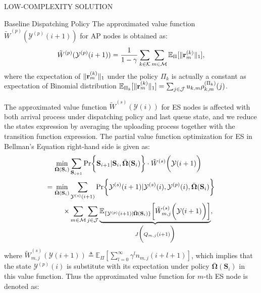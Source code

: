 \documentclass[10pt, conference, letterpaper]{IEEEtran}
\newcommand{\define}{\triangleq}
\renewcommand{\vec}{\mathbf}
\DeclarePairedDelimiter{\set}{\{}{\}}
\DeclarePairedDelimiter{\Inorm}{\|}{\|_1}
\DeclarePairedDelimiter{\Paren}{\bigg(}{\bigg)}
\DeclarePairedDelimiter{\Bracket}{\bigg[}{\bigg]}
\DeclarePairedDelimiter{\Brace}{\bigg\{}{\bigg\}}
\newcommand{\apSet}{\mathcal{K}}
\newcommand{\esSet}{\mathcal{M}}
\newcommand{\jSpace}{\mathcal{J}}
\newcommand{\Stat}{\mathbf{S}}
\newcommand{\Obsv}{\mathcal{Y}}
\newcommand{\Policy}{\boldsymbol{\Omega}}
\newcommand{\BPolicy}{\bar{\Policy}}
\begin{document}
\begin{section}{LOW-COMPLEXITY SOLUTION}
\begin{subsection}{Baseline Dispatching Policy}
            The approximated value function $\tilde{W}^{(p)}(\Obsv^{(p)}(i+1))$ for AP nodes is obtained as:
            \begin{align}
                \tilde{W}^{(p)}(\Obsv^{(p)}(i+1)) = \frac{1}{1-\gamma}
                    \sum_{k\in\apSet}\sum_{m\in\esSet} \mathbb{E}_{\Pi}[\Inorm{\vec{r}^{(k)}_{m}}],
            \end{align}
            where the expectation of $\Inorm{\vec{r}^{(k)}_{m}}$ under the policy $\Pi_k$ is actually a constant as expectation of Binomial distribution $\mathbb{E}_{\Pi_k}[\Inorm{\vec{r}^{(k)}_{m}}] = \sum_{j\in\jSpace} u_{k,m} \rho^{(\Pi_k)}_{k,m}(j)$.
            
            The approximated value function $\tilde{W}^{(s)}(\Obsv(i))$ for ES nodes is affected with both arrival process under dispatching policy and last queue state, and we reduce the states expression by averaging the uploading process together with the transition function expression.
            The partial value function optimization for ES in Bellman's Equation right-hand side is given as:
            \begin{align}
                \min_{\BPolicy(\Stat_i)}& \sum_{\Stat_{i+1}}
                    \Pr\Brace{\Stat_{i+1}|\Stat_{i}, \BPolicy(\Stat_i)} \cdot \tilde{W}^{(s)}\Paren{\Obsv(i+1)}
                \nonumber\\
                = \min_{\BPolicy(\Stat_i)}& \sum_{\Obsv^{(s)}(i+1)}
                    \Pr\Brace{\Obsv^{(s)}(i+1)|\Obsv^{(s)}(i), \Obsv^{(p)}(i), \BPolicy(\Stat_i)}
                    \nonumber\\
                    \times& \sum_{m\in\esSet} \sum_{j\in\jSpace}
                        \underbrace{
                            \mathbb{E}_{\set{\Obsv^{(p)}(i+1)|\BPolicy(\Stat_i)}} \Bracket{\tilde{W}^{(s)}_{m,j}\Paren{\Obsv(i+1)}}
                        }_{
                            J\Paren{Q_{m,j}(i+1)}
                        },
            \end{align}
            where $\tilde{W}^{(s)}_{m,j}(\Obsv(i+1)) \define \mathbb{E}_{\Pi}[\sum_{l=0}^{\infty} \gamma^{l} n_{m,j}(i+l+1)]$, which implies that the state $\Obsv^{(p)}(i)$ is substitute with its expectation under policy $\BPolicy(\Stat_i)$ in this value function.
            Thus the approximated value function for $m$-th ES node is denoted as:
            \begin{align}

\end{align}
\end{subsection}
\end{section}
\end{document}

